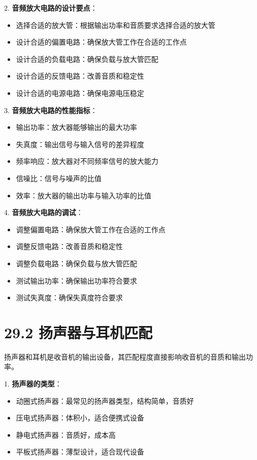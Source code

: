 \documentclass[12pt,UTF8]{ctexbook}
\begin{document}
2. \textbf{音频放大电路的设计要点}：
   \begin{itemize}[leftmargin=3.5em]
   \item 选择合适的放大管：根据输出功率和音质要求选择合适的放大管
   \item 设计合适的偏置电路：确保放大管工作在合适的工作点
   \item 设计合适的负载电路：确保负载与放大管匹配
   \item 设计合适的反馈电路：改善音质和稳定性
   \item 设计合适的电源电路：确保电源电压稳定
   \end{itemize}

3. \textbf{音频放大电路的性能指标}：
   \begin{itemize}[leftmargin=3.5em]
   \item 输出功率：放大器能够输出的最大功率
   \item 失真度：输出信号与输入信号的差异程度
   \item 频率响应：放大器对不同频率信号的放大能力
   \item 信噪比：信号与噪声的比值
   \item 效率：放大器的输出功率与输入功率的比值
   \end{itemize}

4. \textbf{音频放大电路的调试}：
   \begin{itemize}[leftmargin=3.5em]
   \item 调整偏置电路：确保放大管工作在合适的工作点
   \item 调整反馈电路：改善音质和稳定性
   \item 调整负载电路：确保负载与放大管匹配
   \item 测试输出功率：确保输出功率符合要求
   \item 测试失真度：确保失真度符合要求
   \end{itemize}

\section*{29.2 扬声器与耳机匹配}

扬声器和耳机是收音机的输出设备，其匹配程度直接影响收音机的音质和输出功率。

1. \textbf{扬声器的类型}：
   \begin{itemize}[leftmargin=3.5em]
   \item 动圈式扬声器：最常见的扬声器类型，结构简单，音质好
   \item 压电式扬声器：体积小，适合便携式设备
   \item 静电式扬声器：音质好，成本高
   \item 平板式扬声器：薄型设计，适合现代设备
   \end{itemize}
\end{document}
